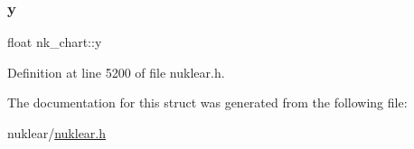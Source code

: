 \subsubsection{\texorpdfstring{y}{y}}
{\footnotesize\ttfamily float nk\+\_\+chart\+::y}



Definition at line 5200 of file nuklear.\+h.



The documentation for this struct was generated from the following file\+:\begin{DoxyCompactItemize}
\item 
nuklear/\mbox{\hyperlink{nuklear_8h}{nuklear.\+h}}\end{DoxyCompactItemize}
